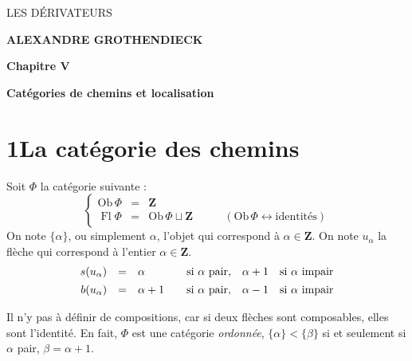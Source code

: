 \documentclass[11pt]{article}
\newcommand{\printedpage}[1]{\marginpar{\footnotesize p.~#1}}
\newcommand{\msp}[1]{\marginpar{\footnotesize [#1]}}
\newcommand{\Ob}{\mathrm{Ob}\,}
\newcommand{\Fl}{\operatorname{Fl}}
\begin{document}
\printedpage{}

\begin{center}
\vspace*{6cm}

{\LARGE\textsf{LES DÉRIVATEURS}}

\vspace{1.5cm}

{\large\textbf{ALEXANDRE GROTHENDIECK}}

\vspace{2.5cm}

{\large\textbf{Chapitre V}}

\vspace{0.4cm}

{\large\textbf{Catégories de chemins et localisation}}
\end{center}

\clearpage

\printedpage{}

\vspace*{6cm}


\clearpage

\printedpage{1}

\msp{page 1}

\section*{1\quad La catégorie des chemins}

Soit $\Phi$ la catégorie suivante :
\[
\left\{
\begin{array}{rcll}
\Ob\Phi & = & \mathbf{Z} & \\
\Fl\Phi & = & \Ob\Phi\sqcup\mathbf{Z} & \qquad (\Ob\Phi\leftrightarrow\text{identités})
\end{array}
\right.
\]
On note $\{\alpha\}$, ou simplement $\alpha$, l'objet qui correspond à $\alpha\in\mathbf{Z}$. On note $u_\alpha$ la flèche qui correspond à l'entier $\alpha\in\mathbf{Z}$.
\[
\begin{array}{rcl@{\qquad}l@{\quad}l@{\quad}l}
s(u_\alpha) & = & \alpha & \text{si } \alpha \text{ pair}, & \alpha+1 & \text{si } \alpha \text{ impair}\\[1ex]
b(u_\alpha) & = & \alpha+1 & \text{si } \alpha \text{ pair}, & \alpha-1 & \text{si } \alpha \text{ impair}
\end{array}
\]


Il n'y pas à définir de compositions, car si deux flèches sont composables, elles sont l'identité. En fait, $\Phi$ est une catégorie \textit{ordonnée}, $\{\alpha\}<\{\beta\}$ si et seulement si $\alpha$ pair, $\beta=\alpha+1$. %
\end{document}
